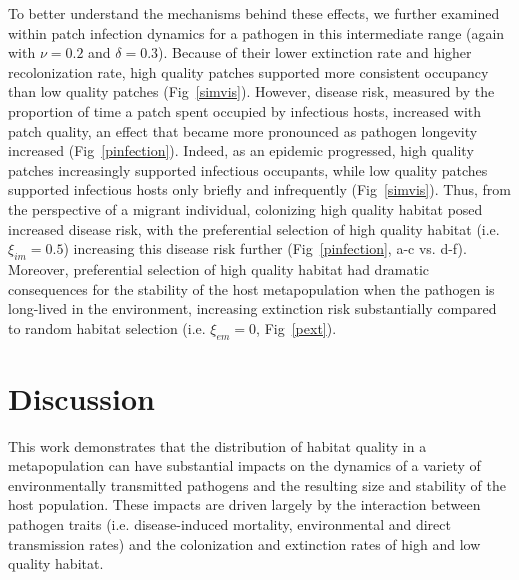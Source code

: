 \documentclass{article}
\begin{document}
To better understand the mechanisms behind these effects, we further examined within patch infection dynamics for a pathogen in this intermediate range (again with $\nu = 0.2$ and $\delta = 0.3$).  
Because of their lower extinction rate and higher recolonization rate, high quality patches supported more consistent occupancy than low quality patches (Fig~\ref{simvis}).  
However, disease risk, measured by the proportion of time a patch spent occupied by infectious hosts, increased with patch quality, an effect that became more pronounced as pathogen longevity increased (Fig~\ref{pinfection}).
Indeed, as an epidemic progressed, high quality patches increasingly supported infectious occupants, while low quality patches supported infectious hosts only briefly and infrequently (Fig~\ref{simvis}).  
Thus, from the perspective of a migrant individual, colonizing high quality habitat posed increased disease risk, with the preferential selection of high quality habitat (i.e. $\xi_{im} = 0.5$) increasing this disease risk further (Fig~\ref{pinfection}, a-c vs. d-f).
Moreover, preferential selection of high quality habitat had dramatic consequences for the stability of the host metapopulation when the pathogen is long-lived in the environment, increasing extinction risk substantially compared to random habitat selection (i.e. $\xi_{em} = 0$, Fig~\ref{pext}).

\section{Discussion}
\label{discussion} 

This work demonstrates that the distribution of habitat quality in a metapopulation can have substantial impacts on the dynamics of a variety of environmentally transmitted pathogens and the resulting size and stability of the host population.  
These impacts are driven largely by the interaction between pathogen traits (i.e. disease-induced mortality, environmental and direct transmission rates) and the colonization and extinction rates of high and low quality habitat.
 
\end{document}
